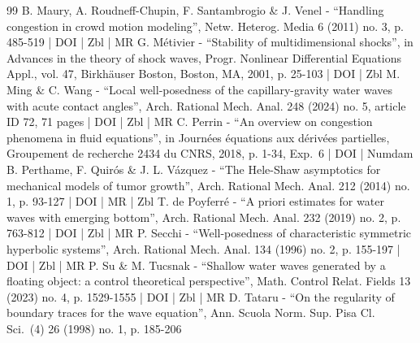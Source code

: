 \documentclass[10pt]{amsart}
\theoremstyle{definition}
\begin{document}
\begin{thebibliography}{99}
B. Maury, A. Roudneff-Chupin, F. Santambrogio \& J. Venel - “Handling congestion in crowd motion modeling”, Netw. Heterog. Media 6 (2011) no. 3, p. 485-519 | DOI | Zbl | MR
G. Métivier - “Stability of multidimensional shocks”, in Advances in the theory of shock waves, Progr. Nonlinear Differential Equations Appl., vol. 47, Birkhäuser Boston, Boston, MA, 2001, p. 25-103 | DOI | Zbl
M. Ming \& C. Wang - “Local well-posedness of the capillary-gravity water waves with acute contact angles”, Arch. Rational Mech. Anal. 248 (2024) no. 5, article ID 72, 71 pages | DOI | Zbl | MR
C. Perrin - “An overview on congestion phenomena in fluid equations”, in Journées équations aux dérivées partielles, Groupement de recherche 2434 du CNRS, 2018, p. 1-34, Exp. 6 | DOI | Numdam
B. Perthame, F. Quirós \& J. L. Vázquez - “The Hele-Shaw asymptotics for mechanical models of tumor growth”, Arch. Rational Mech. Anal. 212 (2014) no. 1, p. 93-127 | DOI | MR | Zbl
T. de Poyferré - “A priori estimates for water waves with emerging bottom”, Arch. Rational Mech. Anal. 232 (2019) no. 2, p. 763-812 | DOI | Zbl | MR
P. Secchi - “Well-posedness of characteristic symmetric hyperbolic systems”, Arch. Rational Mech. Anal. 134 (1996) no. 2, p. 155-197 | DOI | Zbl | MR
P. Su \& M. Tucsnak - “Shallow water waves generated by a floating object: a control theoretical perspective”, Math. Control Relat. Fields 13 (2023) no. 4, p. 1529-1555 | DOI | Zbl | MR
D. Tataru - “On the regularity of boundary traces for the wave equation”, Ann. Scuola Norm. Sup. Pisa Cl. Sci. (4) 26 (1998) no. 1, p. 185-206
\end{thebibliography}
\end{document}

